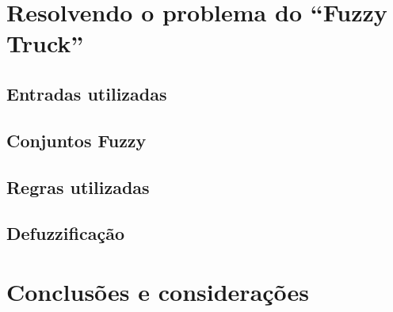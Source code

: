 \documentclass{article}
\begin{document}
    \section{Resolvendo o problema do ``Fuzzy Truck''}

    \subsection{Entradas utilizadas}

    \subsection{Conjuntos Fuzzy}

    \subsection{Regras utilizadas}

    \subsection{Defuzzificação}

    \section{Conclusões e considerações}

    
    
    \nocite{*}
\end{document}
